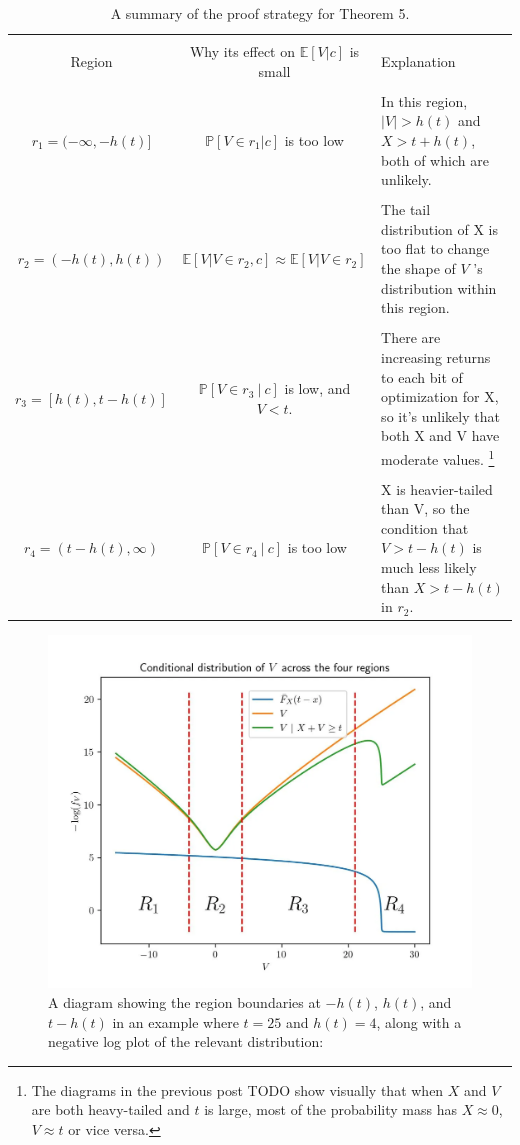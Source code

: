 \documentclass[../neurips_2024.tex]{subfiles}
\begin{document}
\begin{table}
\label{table1}
    \centering
    \begin{tabular}{|c|c|p{70mm}|}
    \hline \\
         Region
        &Why its effect on \(\mathbb E[V|c]\) is small
        & Explanation
    \\ \hline \\
        \(r_1=(-\infty,-h(t)]\)
        & \(\mathbb P[V\in r_1 | c]\) is too low  & In this region, \(|V| > h(t)\) and \(X > t + h(t)\), both of which are unlikely.
    \\ \hline \\
        \(r_2=(-h(t),h(t))\) 
        &  \(\mathbb E[V|V \in r_2, c] \approx \mathbb E[V|V \in r_2]\)
        & The tail distribution of X is too flat to change the shape of \(V\) 's distribution within this region.
    \\ \hline \\
        \(r_3\!=\![h(t),t\!-\!h(t)]\)
        & \(\mathbb P\left[ V \in r_3\ |\ c\right]\) is low, and \(V<t\).
        & There are increasing returns to each bit of optimization for X, so it's unlikely that both X and V have moderate values. \footnote{The diagrams in the previous post TODO show visually that when \(X\) and \(V\) are both heavy-tailed and \(t\) is large, most of the probability mass has \(X \approx 0\), \(V \approx t\) or vice versa.}
    \\ \hline \\
    \(r_4=(t-h(t),\infty)\) &  \(\mathbb P[V\in r_4 \ |\ c]\) is too low
        & X is heavier-tailed than V, so the condition that \(V > t-h(t)\) is much less likely than \(X > t - h(t)\) in \(r_2\).
    \\ \hline
    \end{tabular}
    \caption{A summary of the proof strategy for Theorem 5.}
\end{table}

\begin{figure}
    \centering
    \includegraphics[width=0.5\linewidth]{supplementary/theorem5_diagram.png}
    \caption{A diagram showing the region boundaries at \(-h(t)\), \(h(t)\), and \(t-h(t)\) in an example where \(t=25\) and \(h(t)=4\), along with a negative log plot of the relevant distribution:}
    \label{fig:theorem5-diagram}
\end{figure}
\end{document}
